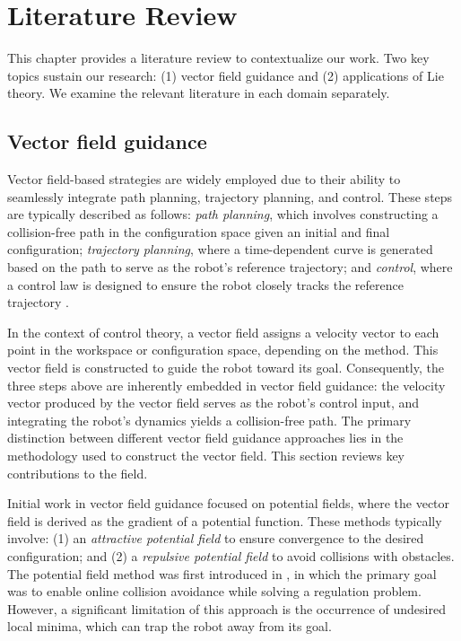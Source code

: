 \chapter{Literature Review} \label{chap:literature-review}
This chapter provides a literature review to contextualize our work. Two key topics sustain our research: (1) vector field guidance and (2) applications of Lie theory. We examine the relevant literature in each domain separately.

\section{Vector field guidance} \label{sec:lit-review-vector-field-guidance}
Vector field-based strategies are widely employed due to their ability to seamlessly integrate path planning, trajectory planning, and control. These steps are typically described as follows: \emph{path planning}, which involves constructing a collision-free path in the configuration space given an initial and final configuration; \emph{trajectory planning}, where a time-dependent curve is generated based on the path to serve as the robot's reference trajectory; and \emph{control}, where a control law is designed to ensure the robot closely tracks the reference trajectory \citep{Rimon1992}.

In the context of control theory, a vector field assigns a velocity vector to each point in the workspace or configuration space, depending on the method. This vector field is constructed to guide the robot toward its goal. Consequently, the three steps above are inherently embedded in vector field guidance: the velocity vector produced by the vector field serves as the robot's control input, and integrating the robot's dynamics yields a collision-free path. The primary distinction between different vector field guidance approaches lies in the methodology used to construct the vector field. This section reviews key contributions to the field.

Initial work in vector field guidance focused on potential fields, where the vector field is derived as the gradient of a potential function. These methods typically involve: (1) an \emph{attractive potential field} to ensure convergence to the desired configuration; and (2) a \emph{repulsive potential field} to avoid collisions with obstacles. The potential field method was first introduced in \citet{Khatib1985}, in which the primary goal was to enable online collision avoidance while solving a regulation problem. However, a significant limitation of this approach is the occurrence of undesired local minima, which can trap the robot away from its goal.

